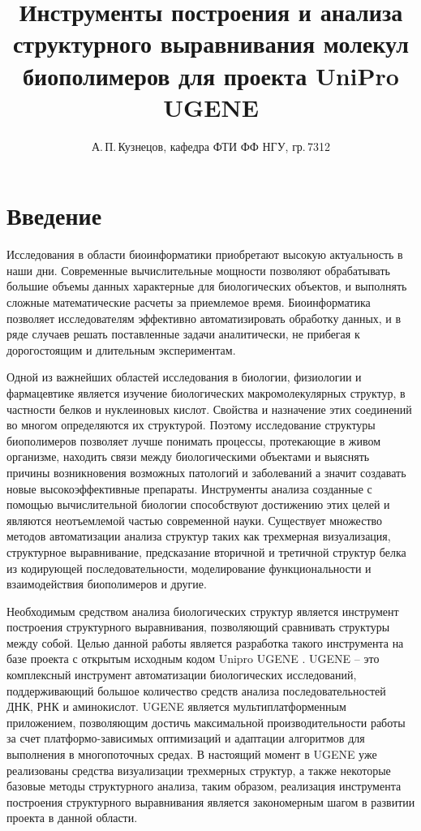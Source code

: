 \documentclass[a4paper, 12pt, titlepage, utf8]{extarticle}
\author{А.\,П.\,Кузнецов, кафедра ФТИ ФФ НГУ, гр.\,7312}
\title{Инструменты построения и анализа структурного выравнивания молекул биополимеров для проекта UniPro UGENE}
\let\oldsection\section         %
\renewcommand{\section}{\newpage\oldsection}
\begin{document}


\tableofcontents
\newpage

\section{Введение}	%
Исследования в области биоинформатики приобретают высокую актуальность в наши дни. Современные вычислительные мощности позволяют обрабатывать большие объемы данных характерные для биологических объектов, и выполнять сложные математические расчеты за приемлемое время. Биоинформатика позволяет исследователям эффективно автоматизировать обработку данных, и в ряде случаев решать поставленные задачи аналитически, не прибегая к дорогостоящим и длительным экспериментам.

Одной из важнейших областей исследования в биологии, физиологии и фармацевтике является изучение биологических макромолекулярных структур, в частности белков и нуклеиновых кислот. Свойства и назначение этих соединений во многом определяются их структурой. Поэтому исследование структуры биополимеров позволяет лучше понимать процессы, протекающие в живом организме, находить связи между биологическими объектами и выяснять причины возникновения возможных патологий и заболеваний а значит создавать новые высокоэффективные препараты. Инструменты анализа созданные с помощью вычислительной биологии способствуют достижению этих целей и являются неотъемлемой частью современной науки. Существует множество методов автоматизации анализа структур таких как трехмерная визуализация,  структурное выравнивание, предсказание вторичной и третичной структур белка из кодирующей последовательности, моделирование функциональности и взаимодействия биополимеров и другие.

Необходимым средством анализа биологических структур является инструмент построения структурного выравнивания, позволяющий сравнивать структуры между собой. Целью данной работы является разработка такого инструмента на базе проекта с открытым исходным кодом Unipro UGENE \cite{ugene}. UGENE -- это комплексный инструмент автоматизации биологических исследований, поддерживающий большое количество средств анализа последовательностей ДНК, РНК и аминокислот. UGENE является мультиплатформенным приложением, позволяющим достичь максимальной производительности работы за счет платформо-зависимых оптимизаций и адаптации алгоритмов для выполнения в многопоточных средах. В настоящий момент в UGENE уже реализованы средства визуализации трехмерных структур, а также некоторые базовые методы структурного анализа, таким образом, реализация инструмента построения структурного выравнивания является закономерным шагом в развитии проекта в данной области.
\end{document}
